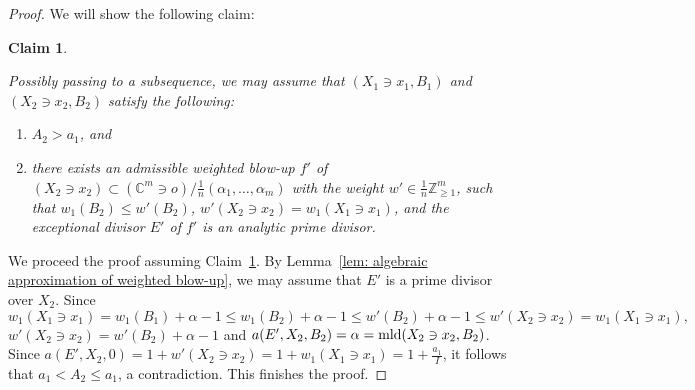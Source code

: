 \documentclass[11pt]{amsart}
\numberwithin{equation}{section}
\newcommand{\Cc}{\mathbb{C}}
\newcommand{\Zz}{\mathbb{Z}}
\newcommand{\mld}{{\rm{mld}}}
\newtheorem{claim}[thm]{Claim}
\theoremstyle{definition}
\theoremstyle{definition}
\begin{document}
\begin{proof}
We will show the following claim:

\begin{claim}\label{claim: auxiliary weights}

Possibly passing to a subsequence, we may assume that $(X_1\ni x_1, B_1)$ and $(X_2\ni x_2, B_2)$ satisfy the following:
\begin{enumerate}
    \item $A_2>a_1$, and 
    \item there exists an admissible weighted blow-up $f'$ of $(X_2\ni x_2)\subset(\mathbb{C}^m\ni o)/\frac{1}{n}(\alpha_1,\dots,\alpha_m)$ with the weight $w'\in\frac{1}{n}\Zz_{\ge 1}^m$, such that $w_1(B_2)\leq w'(B_2)$, $w'(X_2\ni x_2)=w_1(X_1\ni x_1)$, and the exceptional divisor $E'$ of $f'$ is an analytic prime divisor. 
\end{enumerate}
\end{claim}


We proceed the proof assuming Claim~\ref{claim: auxiliary weights}. By Lemma~\ref{lem: algebraic approximation of weighted blow-up}, we may assume that $E'$ is a prime divisor over $X_2$. Since $$w_1(X_1\ni x_1)=w_1(B_1)+\alpha-1\leq w_1(B_2)+\alpha-1\leq w'(B_2)+\alpha-1\leq w'(X_2\ni x_2)=w_1(X_1\ni x_1),$$ $w'(X_2\ni x_2)=w'(B_2)+\alpha-1$ and $a(E',X_2,B_2)=\alpha=\mld(X_2\ni x_2,B_2)$. Since $a(E',X_2,0)=1+w'(X_2\ni x_2)=1+w_1(X_1\ni x_1)=1+\frac{a_1}{I}$, it follows that $a_1<A_2\leq a_1$, a contradiction. This finishes the proof.
\end{proof}
\end{document}
